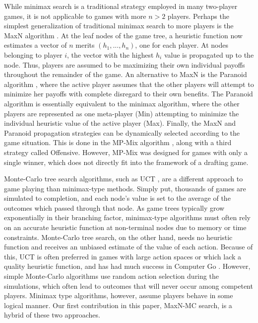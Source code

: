 \documentclass[letterpaper]{article}
\numberwithin{equation}{section}
\numberwithin{theorem}{section}
\numberwithin{lemma}{section}
\numberwithin{df}{section}
\begin{document}
While minimax search is a traditional strategy employed in many two-player games, it is not applicable to games with more $n > 2$ players.  Perhaps the simplest generalization of traditional minimax search to more players is the MaxN algorithm \cite{MaxN}.  At the leaf nodes of the game tree, a heuristic function now estimates a vector of $n$ merits $(h_1, ..., h_n)$, one for each player.  At nodes belonging to player $i$, the vector with the highest $h_i$ value is propagated up to the node.  Thus, players are assumed to be maximizing their own individual payoffs throughout the remainder of the game.  An alternative to MaxN is the Paranoid algorithm \cite{Paranoid}, where the active player assumes that the other players will attempt to minimize her payoffs with complete disregard to their own benefits.  The Paranoid algorithm is essentially equivalent to the minimax algorithm, where the other players are represented as one meta-player (Min) attempting to minimize the individual heuristic value of the active player (Max).  Finally, the MaxN and Paranoid propagation strategies can be dynamically selected according to the game situation.  This is done in the MP-Mix algorithm \cite{ZuckFelnerKraus2009}, along with a third strategy called Offensive.  However, MP-Mix was designed for games with only a single winner, which does not directly fit into the framework of a drafting game.

Monte-Carlo tree search algorithms, such as UCT \cite{UCT}, are a different approach to game playing than minimax-type methods.  Simply put, thousands of games are simulated to completion, and each node's value is set to the average of the outcomes which passed through that node.  As game trees typically grow exponentially in their branching factor, minimax-type algorithms must often rely on an accurate heuristic function at non-terminal nodes due to memory or time constraints.  Monte-Carlo tree search, on the other hand, needs no heuristic function and receives an unbiased estimate of the value of each action.  Because of this, UCT is often preferred in games with large action spaces or which lack a quality heuristic function, and has had much success in Computer Go \cite{ComputerGo}.  However, simple Monte-Carlo algorithms use random action selection during the simulations, which often lead to outcomes that will never occur among competent players.  Minimax type algorithms, however, assume players behave in some logical manner.  Our first contribution in this paper, MaxN-MC search, is a hybrid of these two approaches.
\end{document}

